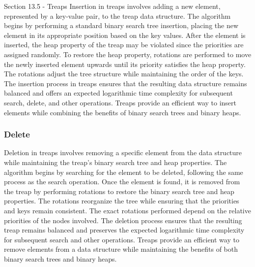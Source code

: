 \begin{notes}{Section 13.5 - Treaps}
    Insertion in treaps involves adding a new element, represented by a key-value pair, to the treap data structure. The algorithm begins by performing a standard binary search tree insertion, placing the new 
    element in its appropriate position based on the key values. After the element is inserted, the heap property of the treap may be violated since the priorities are assigned randomly. To restore the heap 
    property, rotations are performed to move the newly inserted element upwards until its priority satisfies the heap property. The rotations adjust the tree structure while maintaining the order of the keys. 
    The insertion process in treaps ensures that the resulting data structure remains balanced and offers an expected logarithmic time complexity for subsequent search, delete, and other operations. Treaps provide 
    an efficient way to insert elements while combining the benefits of binary search trees and binary heaps.
    
    \subsubsection*{Delete}
    
    Deletion in treaps involves removing a specific element from the data structure while maintaining the treap's binary search tree and heap properties. The algorithm begins by searching for the element to 
    be deleted, following the same process as the search operation. Once the element is found, it is removed from the treap by performing rotations to restore the binary search tree and heap properties. The 
    rotations reorganize the tree while ensuring that the priorities and keys remain consistent. The exact rotations performed depend on the relative priorities of the nodes involved. The deletion process 
    ensures that the resulting treap remains balanced and preserves the expected logarithmic time complexity for subsequent search and other operations. Treaps provide an efficient way to remove elements from 
    a data structure while maintaining the benefits of both binary search trees and binary heaps.
\end{notes}